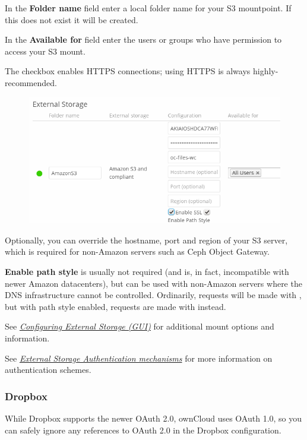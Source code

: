 \documentclass[letterpaper,10pt,english]{sphinxmanual}
\begin{document}
In the \textbf{Folder name} field enter a local folder name for your S3 mountpoint.
If this does not exist it will be created.

In the \textbf{Available for} field enter the users or groups who have permission to
access your S3 mount.

The  checkbox enables HTTPS connections; using HTTPS is always
highly-recommended.
\begin{figure}[htbp]
\centering

\includegraphics{amazons3.png}
\end{figure}

Optionally, you can override the hostname, port and region of your S3 server,
which is required for non-Amazon servers such as Ceph Object Gateway.

\textbf{Enable path style} is usually not required (and is, in fact, incompatible
with newer Amazon datacenters), but can be used with non-Amazon servers where
the DNS infrastructure cannot be controlled. Ordinarily, requests will be
made with , but with path style enabled,
requests are made with  instead.

See {\hyperref[configuration_files/external_storage_configuration_gui::doc]{\emph{Configuring External Storage (GUI)}}} for additional mount
options and information.

See {\hyperref[configuration_files/external_storage/auth_mechanisms::doc]{\emph{External Storage Authentication mechanisms}}} for more information on authentication schemes.


\subsubsection{Dropbox}
\label{configuration_files/external_storage/dropbox:dropbox}\label{configuration_files/external_storage/dropbox::doc}
While Dropbox supports the newer OAuth 2.0, ownCloud uses OAuth 1.0, so you can
safely ignore any references to OAuth 2.0 in the Dropbox configuration.
\end{document}
